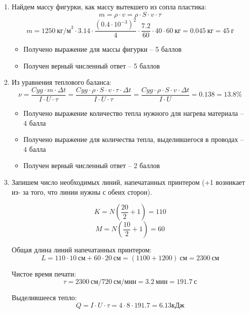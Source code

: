 \solutionSection

\begin{enumerate}
    \item Найдем массу фигурки, как массу вытекшего из сопла пластика:
    $$m =  \rho  \cdot v = \rho  \cdot S \cdot v \cdot \tau$$
    $$m= 1250 \: \text{кг/м}^3 \cdot 3.14 \cdot \frac{(0.4 \cdot 10^{-3})^2}{4} \cdot \frac{7.2}{60} \cdot 40 \cdot 60 \: \text{кг}=0.045 \: \text{кг}=45 \: \text{г}$$

    \markSection
    \begin{itemize}
        \item Получено выражение для массы фигурки – 5 баллов
        \item Получен верный численный ответ – 5 баллов
    \end{itemize}
     
    \item Из уравнения теплового баланса:
    $$\nu =\frac{Cyg \cdot m \cdot \Delta t}{I \cdot U \cdot \tau}=\frac{Cyg \cdot \rho  \cdot S \cdot v \cdot \tau \cdot \Delta t}{I \cdot U \cdot \tau}=\frac{Cyg \cdot \rho  \cdot S \cdot v \cdot \Delta t}{I \cdot U}=0.138=13.8\%$$

    \markSection
    \begin{itemize}
        \item Получено выражение количество тепла нужного для нагрева материала – 4 балла
        \item Получено выражение для количества тепла, выделившегося в проводах – 4 балла
        \item Получен верный численный ответ – 2 баллов
    \end{itemize}
    
    \item Запишем число необходимых линий, напечатанных принтером (+1 возникает из- за того, что линии нужны с обеих сторон).
    
    $$K=N(\frac{20}{2}+1)=110$$
    $$M=N(\frac{10}{2}+1)=60$$
    
    Общая длина линий напечатанных принтером:
    $$L = 110 \cdot 10 \: \text{см} +60 \cdot 20 \: \text{см} = (1100 + 1200) \: \text{см} = 2300 \: \text{см}$$

    Чистое время печати:
    $$\tau = 2300 \: \text{см}/720 \: \text{см/мин} = 3.2 \: \text{мин} = 191.7 \: \text{с}$$

    Выделившееся тепло:
    $$Q = I \cdot U \cdot \tau = 4 \cdot 8 \cdot 191.7 = 6.13 кДж$$


\end{enumerate}
